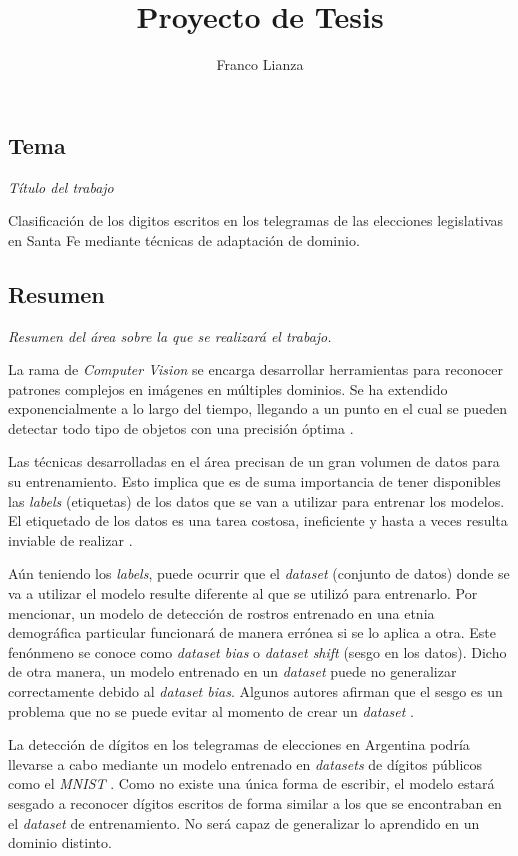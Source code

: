 \documentclass[a4paper, twoside]{report}
\title{Proyecto de Tesis}
\author{Franco Lianza}
\begin{document}

\newpage

\subsection*{Tema}
{\it Título del trabajo}

Clasificaci\'on de los digitos escritos en los telegramas de las elecciones legislativas en Santa Fe mediante t\'ecnicas de adaptaci\'on de dominio.

\subsection*{Resumen}
{\it Resumen del área sobre la que se realizará el trabajo.}

La rama de {\it Computer Vision} se encarga desarrollar herramientas para reconocer patrones complejos en im\'agenes en m\'ultiples dominios. Se ha extendido
exponencialmente a lo largo del tiempo, llegando a un punto en el cual se pueden detectar todo tipo de objetos con una precisi\'on \'optima
\cite{szeliski2010computer}.

Las t\'ecnicas desarrolladas en el \'area precisan de un gran volumen de datos para su entrenamiento. Esto implica que es de suma importancia de tener
disponibles las {\it labels} (etiquetas) de los datos que se van a utilizar para entrenar los modelos. El etiquetado de los datos es una tarea costosa,
ineficiente y hasta a veces resulta inviable de realizar \cite{reis2022data}.

A\'un teniendo los {\it labels}, puede ocurrir que el {\it dataset} (conjunto de datos) donde se va a utilizar el modelo resulte diferente al que se utilizó
para entrenarlo. Por mencionar, un modelo de detecci\'on de rostros entrenado en una etnia demogr\'afica particular funcionar\'a de manera err\'onea si se lo
aplica a otra. Este fen\'onmeno se conoce como {\it dataset bias} o {\it dataset shift} (sesgo en los datos). Dicho de otra manera, un modelo entrenado en un
	{\it dataset} puede no generalizar correctamente debido al {\it dataset bias}. Algunos autores afirman que el sesgo es un problema que no se puede evitar al
momento de crear un {\it dataset} \cite{khosla2012undoing}.

La detecci\'on de d\'igitos en los telegramas de elecciones en Argentina podr\'ia llevarse a cabo mediante un modelo entrenado en {\it datasets} de d\'igitos
p\'ublicos como el {\it MNIST} \cite{lecun1998gradient}. Como no existe una \'unica forma de escribir, el modelo estar\'a sesgado a reconocer d\'igitos
escritos de forma similar a los que se encontraban en el {\it dataset} de entrenamiento. No ser\'a capaz de generalizar lo aprendido en un dominio distinto.
\end{document}
